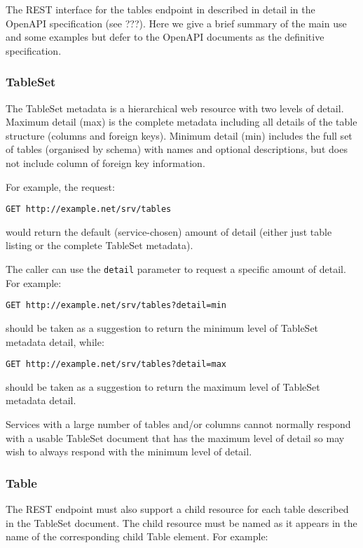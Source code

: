 \documentclass[11pt,letter]{ivoa}
\begin{document}
The REST interface for the tables endpoint in described in detail in the OpenAPI
specification (see ???). Here we give a brief summary of the main use and some
examples but defer to the OpenAPI documents as the definitive specification.

\subsubsection{TableSet}
The TableSet metadata is a hierarchical web resource with two levels of detail.
Maximum detail (max) is the complete metadata including all details of the table
structure (columns and foreign keys).  Minimum detail (min) includes the full
set of tables (organised by schema) with names and optional descriptions, but does not
include column of foreign key information.

For example, the request:

\begin{verbatim}
GET http://example.net/srv/tables
\end{verbatim}
\noindent would return the default (service-chosen) amount of detail (either just table
listing or the complete TableSet metadata). 

The caller can use the \verb|detail| parameter to request a specific amount of detail.
For example:
\begin{verbatim}
GET http://example.net/srv/tables?detail=min
\end{verbatim}
\noindent should be taken as a suggestion to return the minimum level of TableSet
metadata detail, while:
\begin{verbatim}
GET http://example.net/srv/tables?detail=max
\end{verbatim}
\noindent should be taken as a suggestion to return the maximum level of TableSet
metadata detail.

Services with a large number of tables and/or columns cannot normally
respond with a usable TableSet document that has the maximum level of
detail so may wish to always respond with the minimum level of detail.

\subsubsection{Table}
The REST endpoint must also support a child resource for each table
described in the TableSet document.  The child resource must be named as
it appears in the name of the corresponding child Table element.  For
example:
\end{document}
